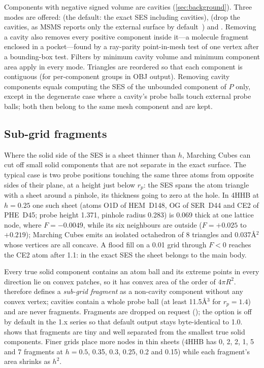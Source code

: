 Components with negative signed volume are cavities (\cref{sec:background}).
Three modes are offered:  (the default: the exact SES including
cavities),  (drop the cavities, as MSMS reports only the
external surface by default~\cite{msmsmanual}) and . Removing a
cavity also removes every positive component inside it---a molecule
fragment enclosed in a pocket---found by a ray-parity point-in-mesh test of
one vertex after a bounding-box test. Filters by minimum cavity volume and
minimum component area apply in every mode. Triangles are reordered so that
each component is contiguous (for per-component groups in OBJ output).
Removing cavity components equals computing the SES of the unbounded
component of $P$ only, except in the degenerate case where a cavity's probe
balls touch external probe balls; both then belong to the same mesh
component and are kept.

\subsection{Sub-grid fragments}
\label{sec:fragments}

Where the solid side of the SES is a sheet thinner than $h$, Marching Cubes
can cut off small solid components that are not separate in the exact
surface. The typical case is two probe positions touching the same three
atoms from opposite sides of their plane, at a height just below $r_p$: the
SES spans the atom triangle with a sheet around a pinhole, its thickness
going to zero at the hole. In 4HHB at $h = 0.25$\Ang{} one such sheet
(atoms O1D of HEM~D148, OG of SER~D44 and CE2 of PHE~D45; probe height
1.371\Ang, pinhole radius 0.283\Ang) is 0.069\Ang{} thick at one lattice
node, where $F = -0.0049$\Ang, while its six neighbours are outside
($F = +0.025$ to $+0.219$\Ang); Marching Cubes emits an isolated octahedron
of 8 triangles and 0.037\AA$^2$ whose vertices are all concave. A flood
fill on a 0.01\Ang{} grid through $F < 0$ reaches the CE2 atom after
1.1\Ang: in the exact SES the sheet belongs to the main body.

Every true solid component contains an atom ball and its extreme points in
every direction lie on convex patches, so it has convex area of the order of
$4\pi R^2$. \sesmesh{} therefore defines a \emph{sub-grid fragment} as a
non-cavity component without any convex vertex; cavities contain a whole
probe ball (at least 11.5\AA$^3$ for $r_p = 1.4$\Ang) and are never
fragments. Fragments are dropped on request (); the
option is off by default in the 1.x series so that default output stays
byte-identical to 1.0.  shows that fragments are tiny
and well separated from the smallest true solid components. Finer grids
place more nodes in thin sheets (4HHB has 0, 2, 2, 1, 5 and 7 fragments at
$h = 0.5$, 0.35, 0.3, 0.25, 0.2 and 0.15\Ang) while each fragment's area
shrinks as $h^2$.

